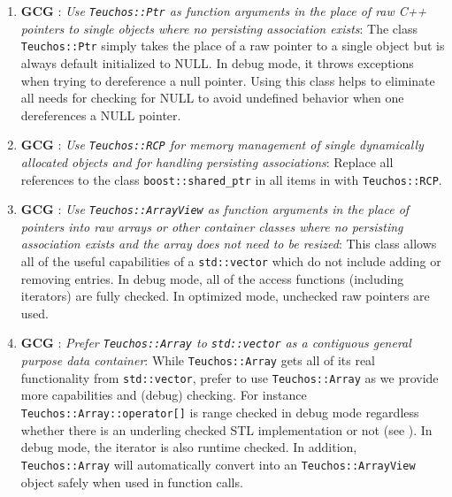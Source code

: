 \begin{enumerate}
{}\item{}\textbf{GCG }:
{}\textit{Use {}\texttt{Teuchos::Ptr} as function arguments in the place of
raw C++ pointers to single objects where no persisting association exists}:
The class {}\texttt{Teuchos\-::Ptr} simply takes the place of a raw pointer to
a single object but is always default initialized to NULL.  In debug mode, it
throws exceptions when trying to dereference a null pointer.  Using this class
helps to eliminate all needs for checking for NULL to avoid undefined behavior
when one dereferences a NULL pointer.

{}\item{}\textbf{GCG }:
{}\textit{Use {}\texttt{Teuchos::RCP} for memory management of single
dynamically allocated objects and for handling persisting
{}\cite{RCPBeginnersGuide} associations}: Replace all references to the class
{}\texttt{boost::\-shared\_ptr} in all items in {}\cite{C++CodingStandards05}
with {}\texttt{Teuchos::\-RCP}.

{}\item{}\textbf{GCG }:
{}\textit{Use {}\texttt{Teuchos::ArrayView} as function arguments in the place
of pointers into raw arrays or other container classes where no persisting
association exists and the array does not need to be resized}: This class
allows all of the useful capabilities of a {}\texttt{std::vector} which do not
include adding or removing entries.  In debug mode, all of the access
functions (including iterators) are fully checked.  In optimized mode,
unchecked raw pointers are used.

{}\item{}\textbf{GCG }:
{}\textit{Prefer {}\texttt{Teuchos::Array} to {}\texttt{std::vector} as a
contiguous general purpose data container}: While {}\texttt{Teuchos::\-Array}
gets all of its real functionality from {}\texttt{std::\-vector}, prefer to
use {}\texttt{Teuchos::\-Array} as we provide more capabilities and (debug)
checking.  For instance {}\texttt{Teuchos::\-Array::\-operator[]} is range
checked in debug mode regardless whether there is an underling checked STL
implementation or not (see {}\cite[Item 83]{C++CodingStandards05}).  In debug
mode, the iterator is also runtime checked.  In addition,
{}\texttt{Teuchos\-::Array} will automatically convert into an
{}\texttt{Teuchos\-::ArrayView} object safely when used in function calls.


\end{enumerate}
